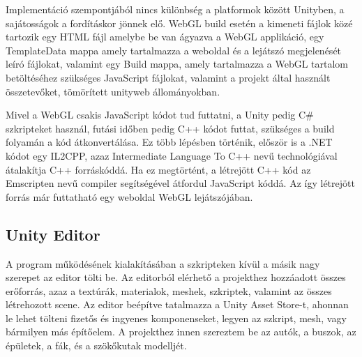 Implementáció szempontjából nincs különbség a platformok között Unityben, a sajátosságok a fordításkor jönnek elő. WebGL build esetén a kimeneti fájlok közé tartozik egy HTML fájl amelybe be van ágyazva a WebGL applikáció, egy TemplateData mappa amely tartalmazza a weboldal és a lejátszó megjelenését leíró fájlokat, valamint egy Build mappa, amely tartalmazza a WebGL tartalom betöltéséhez szükséges JavaScript fájlokat, valamint a projekt által használt összetevőket, tömörített unityweb állományokban.

Mivel a WebGL csakis JavaScript kódot tud futtatni, a Unity pedig C\# szkripteket használ, futási időben pedig C++ kódot futtat, szükséges a build folyamán a kód átkonvertálása. Ez több lépésben történik, először is a .NET kódot egy IL2CPP, azaz Intermediate Language To C++ nevű technológiával átalakítja C++ forráskóddá.  Ha ez megtörtént, a létrejött C++ kód az Emscripten nevű compiler segítségével átfordul JavaScript kóddá. Az így létrejött forrás már futtatható egy weboldal WebGL lejátszójában.
\subsection{Unity Editor}
A program működésének kialakításában a szkripteken kívül a másik nagy szerepet az editor tölti be. Az editorból elérhető a projekthez hozzáadott összes erőforrás, azaz a textúrák, materialok, meshek, szkriptek, valamint az összes létrehozott scene.
Az editor beépítve tatalmazza a Unity Asset Store-t, ahonnan le lehet tölteni fizetős és ingyenes komponenseket, legyen az szkript, mesh, vagy bármilyen más építőelem. A projekthez innen szereztem be az autók, a buszok, az épületek, a fák, és a szökőkutak modelljét.

